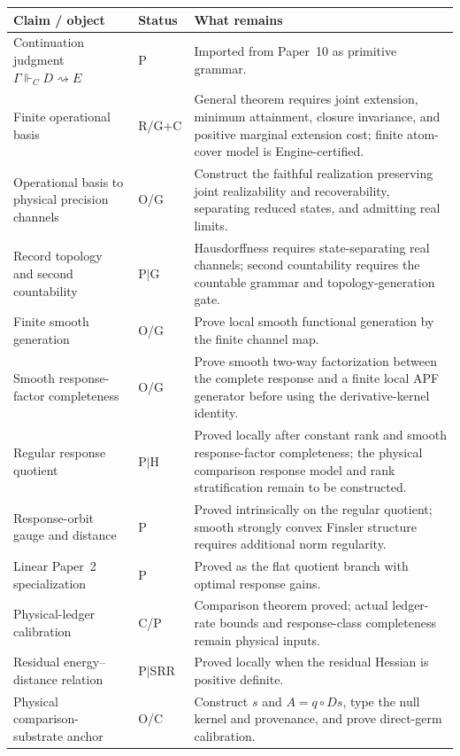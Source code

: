 \documentclass[11pt]{article}
\theoremstyle{remark}
\newcommand{\G}{\Gamma}
\newcommand{\entails}{\Vdash}
\newcommand{\goes}{\rightsquigarrow}
\newcommand{\Status}[1]{\textsf{#1}}
\begin{document}
\begin{longtable}{@{}p{}p{}p{}@{}}
\toprule
Claim / object & Status & What remains \\
\midrule
Continuation judgment $\G\entails_C D\goes E$ & \Status{P} & Imported from Paper~10 as primitive grammar. \\
Finite operational basis & \Status{R/G+C} & General theorem requires joint extension, minimum attainment, closure invariance, and positive marginal extension cost; finite atom-cover model is Engine-certified. \\
Operational basis to physical precision channels & \Status{O/G} & Construct the faithful realization preserving joint realizability and recoverability, separating reduced states, and admitting real limits. \\
Record topology and second countability & \Status{P$\mid$G} & Hausdorffness requires state-separating real channels; second countability requires the countable grammar and topology-generation gate. \\
Finite smooth generation & \Status{O/G} & Prove local smooth functional generation by the finite channel map. \\
Smooth response-factor completeness & \Status{O/G} & Prove smooth two-way factorization between the complete response and a finite local APF generator before using the derivative-kernel identity. \\
Regular response quotient & \Status{P$\mid$H} & Proved locally after constant rank and smooth response-factor completeness; the physical comparison response model and rank stratification remain to be constructed. \\
Response-orbit gauge and distance & \Status{P} & Proved intrinsically on the regular quotient; smooth strongly convex Finsler structure requires additional norm regularity. \\
Linear Paper~2 specialization & \Status{P} & Proved as the flat quotient branch with optimal response gains. \\
Physical-ledger calibration & \Status{C/P} & Comparison theorem proved; actual ledger-rate bounds and response-class completeness remain physical inputs. \\
Residual energy--distance relation & \Status{P$\mid$SRR} & Proved locally when the residual Hessian is positive definite. \\
Physical comparison-substrate anchor & \Status{O/C} & Construct $s$ and $A=q\circ Ds$, type the null kernel and provenance, and prove direct-germ calibration. \\

\end{longtable}
\end{document}
